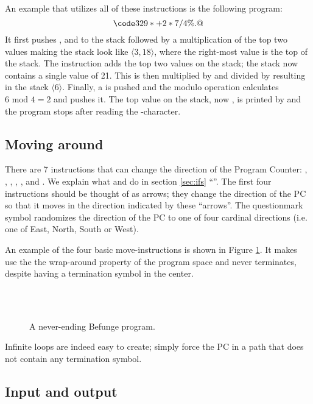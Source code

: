 \documentclass[12pt, a4paper]{article}
\begin{document}
An example that utilizes all of these instructions is the following program:
$$\code{329*+2*7/4\%.@}$$
It first pushes ,  and  to the stack followed by a multiplication of the top two values making the stack look like $\langle 3, 18 \rangle$, where the right-most value is the top of the stack. The \code{+} instruction adds the top two values on the stack; the stack now contains a single value of 21. This is then multiplied by  and divided by  resulting in the stack $\langle 6 \rangle$. Finally, a  is pushed and the modulo operation \code{\%} calculates $6 \text{ mod } 4 = 2$ and pushes it. The top value on the stack, now , is printed by  and the program stops after reading the -character.

\subsection{Moving around}
\label{sec:movement}

There are 7 instructions that can change the direction of the Program Counter: \code{>}, , \code{<}, \code{\^}, , \code{\_} and \code{|}. We explain what \code{\_} and \code{|} do in section \ref{sec:ifs} “”. The first four instructions should be thought of as arrows; they change the direction of the PC so that it moves in the direction indicated by these “arrows”. The questionmark symbol  randomizes the direction of the PC to one of four cardinal directions (i.e. one of East, North, South or West).

An example of the four basic move-instructions is shown in Figure \ref{fig:basicmove}. It makes use the the wrap-around property of the program space and never terminates, despite having a termination symbol in the center.

\begin{figure}[!ht]
\centering
\code{< \^{}}\\
\\
\caption{A never-ending Befunge program.}
\label{fig:basicmove}
\end{figure}

Infinite loops are indeed easy to create; simply force the PC in a path that does not contain any termination symbol.

\subsection{Input and output}
\label{sec:io}
\end{document}
